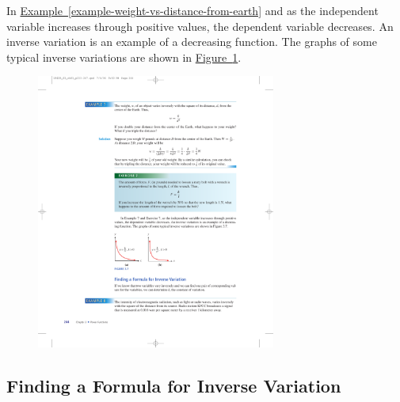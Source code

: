 \documentclass[10pt,]{book}
\theoremstyle{plain}
\theoremstyle{definition}
\theoremstyle{definition}
\theoremstyle{definition}
\theoremstyle{definition}
\theoremstyle{definition}
\numberwithin{equation}{section}
\begin{document}
	In \hyperref[example-weight-vs-distance-from-earth]{Example~\ref{example-weight-vs-distance-from-earth}} and  as the independent variable increases through positive values, the dependent variable decreases. An inverse variation is an example of a decreasing function. The graphs of some typical inverse variations are shown in \hyperref[fig-inverse-variation-with-power]{Figure~\ref{fig-inverse-variation-with-power}}.
%
\leavevmode%
\begin{figure}
\centering
\includegraphics[width=0.70\textwidth,]{images/fig-inverse-variation-with-power.pdf}\caption{\label{fig-inverse-variation-with-power}}
\end{figure}
\typeout{************************************************}
\typeout{************************************************}
\subsection[Finding a Formula for Inverse Variation]{Finding a Formula for Inverse Variation}\label{subsection-62}
\end{document}
